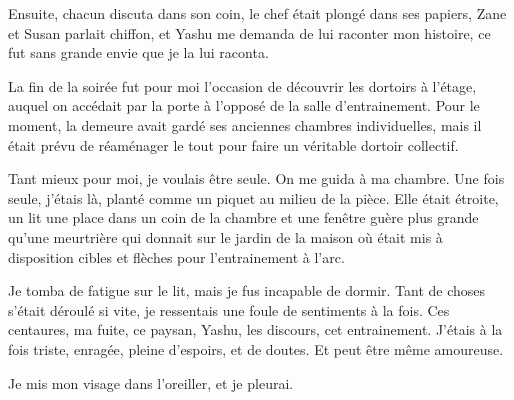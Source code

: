 \documentclass{book}
\begin{document}
Ensuite, chacun discuta dans son coin, le chef était plongé dans ses papiers, Zane et Susan parlait chiffon, et Yashu me demanda de lui raconter mon histoire, ce fut sans grande envie que je la lui raconta.\newline

La fin de la soirée fut pour moi l'occasion de découvrir les dortoirs à l'étage, auquel on accédait par la porte à l'opposé de la salle d'entrainement. Pour le moment, la demeure avait gardé ses anciennes chambres individuelles, mais il était prévu de réaménager le tout pour faire un véritable dortoir collectif.\newline

Tant mieux pour moi, je voulais être seule. On me guida à ma chambre. Une fois seule, j'étais là, planté comme un piquet au milieu de la pièce. Elle était étroite, un lit une place dans un coin de la chambre et une fenêtre guère plus grande qu'une meurtrière qui donnait sur le jardin de la maison où était mis à disposition cibles et flèches pour l'entrainement à l'arc.\newline

Je tomba de fatigue sur le lit, mais je fus incapable de dormir. Tant de choses s'était déroulé si vite, je ressentais une foule de sentiments à la fois. Ces centaures, ma fuite, ce paysan, Yashu, les discours, cet entrainement. J'étais à la fois triste, enragée, pleine d'espoirs, et de doutes. Et peut être même amoureuse.\newline

Je mis mon visage dans l'oreiller, et je pleurai.\newline
\end{document}
